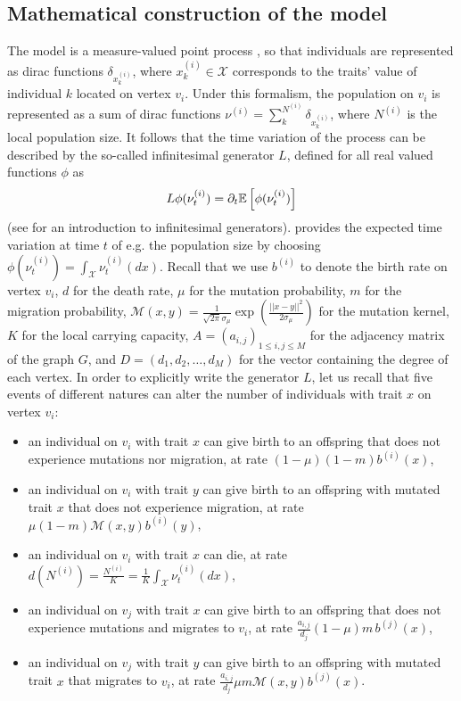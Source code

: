     \subsection{Mathematical construction of the model}\label{secSI:formal_descrip}
    The model is a measure-valued point process \citep{Bansaye2015}, so that individuals are represented as dirac functions $\delta_{x_{k}^{(i)}}$, where $x_{k}^{(i)} \in \mathcal{X}$ corresponds to the traits' value of individual $k$ located on vertex $v_i$.
    Under this formalism, the population on $v_i$ is represented as a sum of dirac functions $\nu^{(i)} = \sum^{N^{(i)}}_k \delta_{x_{k}^{(i)}}$, where $N^{(i)}$ is the local population size. 
    It follows that the time variation of the process can be described by the so-called infinitesimal generator $L$, defined for all real valued functions $\phi$ as
    \begin{equation}\label{eqSI:def_infgen}
         L \phi(\nu^{(i)}_t) = \partial_t {\mathbb{E}} \left[\phi(\nu^{(i)}_t) \right]
    \end{equation}
    (see \citep{Linke2015} for an introduction to infinitesimal generators).  provides the expected time variation at time $t$ of e.g. the population size by choosing $\phi(\nu^{(i)}_t) = \int_\mathcal{X} \nu^{(i)}_t(dx)$.
    Recall that we use
    $b^{(i)}$ to denote the birth rate on vertex $v_i$,
    $d$ for the death rate,
    $\mu$ for the mutation probability,
    $m$ for the migration probability,
    $\mathcal{M}(x,y) = \frac{1}{\sqrt{2\pi}\sigma_\mu} \exp \left(\frac{||x-y||^2}{2\sigma_\mu} \right)$ for the mutation kernel,
    $K$ for the local carrying capacity,
    $A = (a_{i,j})_{1\leq i, j \leq M}$ for the adjacency matrix of the graph $G$, and
    $D = (d_1,d_2,\dots,d_M)$ for the vector containing the degree of each vertex.
    In order to explicitly write the generator $L$,
    let us recall that five events of different natures can alter the number of individuals with trait $x$ on vertex $v_i$:
    \begin{itemize}
        \item an individual on $v_i$ with trait $x$ can give birth to an offspring that does not experience mutations nor migration, at rate $(1 - \mu ) (1 - m) b^{(i)}(x)$,
        \item an individual on $v_i$ with trait $y$ can give birth to an offspring with mutated trait $x$ that does not experience migration, at rate $\mu (1-m) \mathcal{M}(x,y) b^{(i)}(y)$,
        \item an individual on $v_i$ with trait $x$ can die, at rate $d(N^{(i)}) = \frac{N^{(i)}}{K} = \frac{1}{K} \int_\mathcal{X} \nu_t^{(i)} (dx)$,
        \item an individual on $v_j$ with trait $x$ can give birth to an offspring that does not experience mutations and migrates to $v_i$, at rate $ \frac{a_{i,j}}{d_j} (1 - \mu ) m \, b^{(j)}(x)$,
        \item an individual on $v_j$ with trait $y$ can give birth to an offspring with mutated trait $x$ that migrates to $v_i$, at rate $ \frac{a_{i,j}}{d_j} \mu  m \mathcal{M}(x,y) b^{(j)}(x)$.
    \end{itemize}
